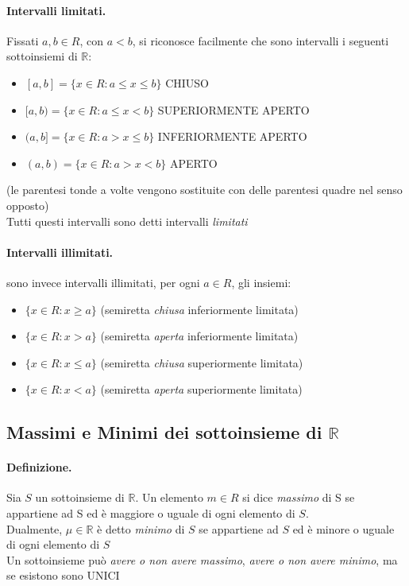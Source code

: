 \documentclass[12pt, a4paper, openany]{book}
\begin{document}
\paragraph{Intervalli limitati.}
Fissati $a, b \in R$, con $a<b$, si riconosce facilmente che sono intervalli i seguenti sottoinsiemi di $\mathbb{R}$:
\begin{itemize}
    \item[] $[a,b] = \{x \in R : a \leq x \leq b\}$ CHIUSO
    \item[] $[a,b) = \{x \in R : a \leq x < b\}$ SUPERIORMENTE APERTO
    \item[] $(a,b] = \{x \in R : a > x \leq b\}$ INFERIORMENTE APERTO
    \item[] $(a,b) = \{x \in R : a > x < b\}$ APERTO
\end{itemize}
{\tiny(le parentesi tonde a volte vengono sostituite con delle parentesi quadre nel senso opposto)}
\\Tutti questi intervalli sono detti intervalli \emph{limitati}
\paragraph{Intervalli illimitati.} sono invece intervalli illimitati, per ogni $a \in R$, gli insiemi:
\begin{itemize}
    \item[] $\{x \in R: x \geq a\}$ (semiretta \emph{chiusa} inferiormente limitata)
    \item[] $\{x \in R: x > a\}$ (semiretta \emph{aperta} inferiormente limitata)
    \item[] $\{x \in R: x \leq a\}$ (semiretta \emph{chiusa} superiormente limitata)
    \item[] $\{x \in R: x < a\}$ (semiretta \emph{aperta} superiormente limitata)
\end{itemize}

\subsection{Massimi e Minimi dei sottoinsieme di $\mathbb{R}$}
\paragraph{Definizione.} Sia $S$ un sottoinsieme di $\mathbb{R}$. Un elemento $m\in R$ si dice \emph{massimo} di S se appartiene ad S ed è maggiore o uguale di ogni elemento di $S$.
\\Dualmente, $\mu \in \mathbb{R} $ è detto \emph{minimo} di $S$ se appartiene ad $S$ ed è minore o uguale di ogni elemento di $S$
\\Un sottoinsieme può \emph{avere o non avere massimo}, \emph{avere o non avere minimo}, ma se esistono sono UNICI
\end{document}
